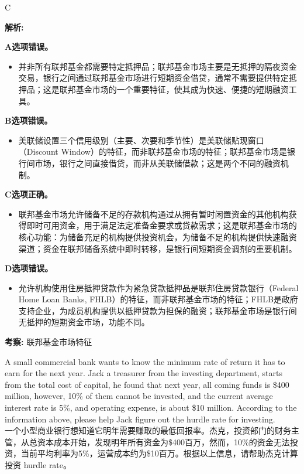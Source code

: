 \documentclass{article}
\newcounter{question} %
\newenvironment{explanation}
{\textbf{解析:}\par}
{\par}
\newcommand{\checklist}[1]{
    \textbf{考察:} #1 \par %
    \addcontentsline{toc}{subsection}{题号\thequestion 考察: #1} %
    \vspace{2em} %
}
\begin{document}
\begin{correctanswer}
    C
\end{correctanswer}

\begin{explanation}
    \textbf{A选项错误。}
    \begin{itemize}
        \item 并非所有联邦基金都需要特定抵押品；联邦基金市场主要是无抵押的隔夜资金交易，银行之间通过联邦基金市场进行短期资金借贷，通常不需要提供特定抵押品；这是联邦基金市场的一个重要特征，使其成为快速、便捷的短期融资工具。
    \end{itemize}

    \textbf{B选项错误。}
    \begin{itemize}
        \item 美联储设置三个信用级别（主要、次要和季节性）是美联储贴现窗口（Discount Window）的特征，而非联邦基金市场的特征；联邦基金市场是银行间市场，银行之间直接借贷，而非从美联储借款；这是两个不同的融资机制。
    \end{itemize}

    \textbf{C选项正确。}
    \begin{itemize}
        \item 联邦基金市场允许储备不足的存款机构通过从拥有暂时闲置资金的其他机构获得即时可用资金，用于满足法定准备金要求或贷款需求；这是联邦基金市场的核心功能：为储备充足的机构提供投资机会，为储备不足的机构提供快速融资渠道；资金在联邦储备系统中即时转移，是银行间短期资金调剂的重要机制。
    \end{itemize}

    \textbf{D选项错误。}
    \begin{itemize}
        \item 允许机构使用住房抵押贷款作为紧急贷款抵押品是联邦住房贷款银行（Federal Home Loan Banks, FHLB）的特征，而非联邦基金市场的特征；FHLB是政府支持企业，为成员机构提供以抵押贷款为担保的融资；联邦基金市场是银行间无抵押的短期资金市场，功能不同。
    \end{itemize}
\end{explanation}
\checklist{联邦基金市场特征}


\begin{question}
    A small commercial bank wants to know the minimum rate of return it has to earn for the next year. Jack a treasurer from the investing department, starts from the total cost of capital, he found that next year, all coming funds is \$400 million, however, 10\% of them cannot be invested, and the current average interest rate is 5\%, and operating expense, is about \$10 million. According to the information above, please help Jack figure out the hurdle rate for investing.\\
    一个小型商业银行想知道它明年需要赚取的最低回报率。杰克，投资部门的财务主管，从总资本成本开始，发现明年所有资金为\$400百万，然而，10\%的资金无法投资，当前平均利率为5\%，运营成本约为\$10百万。根据以上信息，请帮助杰克计算投资 hurdle rate。
\end{question}
\end{document}
